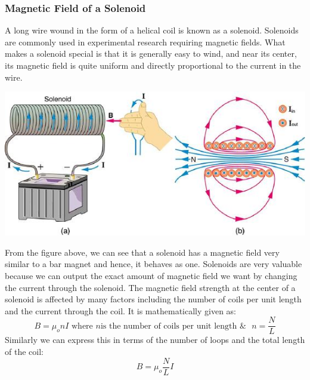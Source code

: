 \documentclass[9pt]{article}
\begin{document}
		\subsubsection*{Magnetic Field of a Solenoid}
		A long wire wound in the form of a helical coil is known as a solenoid. Solenoids are commonly used in experimental research requiring magnetic fields. What makes a solenoid special is that it is generally easy to wind, and near its center, its magnetic field is quite uniform and directly proportional to the current in the wire.
		\begin{center}
			\includegraphics[scale=0.5]{solenoid}
		\end{center}
		From the figure above, we can see that a solenoid has a magnetic field very similar to a bar magnet and hence, it behaves as one. Solenoids are very valuable because we can output the exact amount of magnetic field we want by changing the current through the solenoid. The magnetic field strength at the center of a solenoid is affected by many factors including the number of coils per unit length and the current through the coil. It is mathematically given as:
		$$B=\mu_onI\text{ where }n\text{is the number of coils per unit length }\&\text{ }n=\dfrac{N}{L}$$
		Similarly we can express this in terms of the number of loops and the total length of the coil:
		$$B=\mu_o\dfrac{N}{L}I$$
\end{document}
